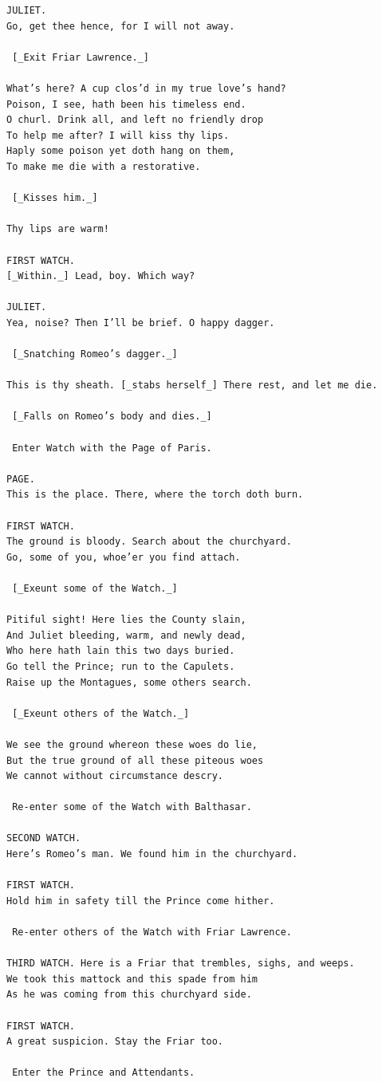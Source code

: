 \documentclass{article}
\begin{document}
\begin{verbatim}
JULIET.
Go, get thee hence, for I will not away.

 [_Exit Friar Lawrence._]

What’s here? A cup clos’d in my true love’s hand?
Poison, I see, hath been his timeless end.
O churl. Drink all, and left no friendly drop
To help me after? I will kiss thy lips.
Haply some poison yet doth hang on them,
To make me die with a restorative.

 [_Kisses him._]

Thy lips are warm!

FIRST WATCH.
[_Within._] Lead, boy. Which way?

JULIET.
Yea, noise? Then I’ll be brief. O happy dagger.

 [_Snatching Romeo’s dagger._]

This is thy sheath. [_stabs herself_] There rest, and let me die.

 [_Falls on Romeo’s body and dies._]

 Enter Watch with the Page of Paris.

PAGE.
This is the place. There, where the torch doth burn.

FIRST WATCH.
The ground is bloody. Search about the churchyard.
Go, some of you, whoe’er you find attach.

 [_Exeunt some of the Watch._]

Pitiful sight! Here lies the County slain,
And Juliet bleeding, warm, and newly dead,
Who here hath lain this two days buried.
Go tell the Prince; run to the Capulets.
Raise up the Montagues, some others search.

 [_Exeunt others of the Watch._]

We see the ground whereon these woes do lie,
But the true ground of all these piteous woes
We cannot without circumstance descry.

 Re-enter some of the Watch with Balthasar.

SECOND WATCH.
Here’s Romeo’s man. We found him in the churchyard.

FIRST WATCH.
Hold him in safety till the Prince come hither.

 Re-enter others of the Watch with Friar Lawrence.

THIRD WATCH. Here is a Friar that trembles, sighs, and weeps.
We took this mattock and this spade from him
As he was coming from this churchyard side.

FIRST WATCH.
A great suspicion. Stay the Friar too.

 Enter the Prince and Attendants.


\end{verbatim}
\end{document}
